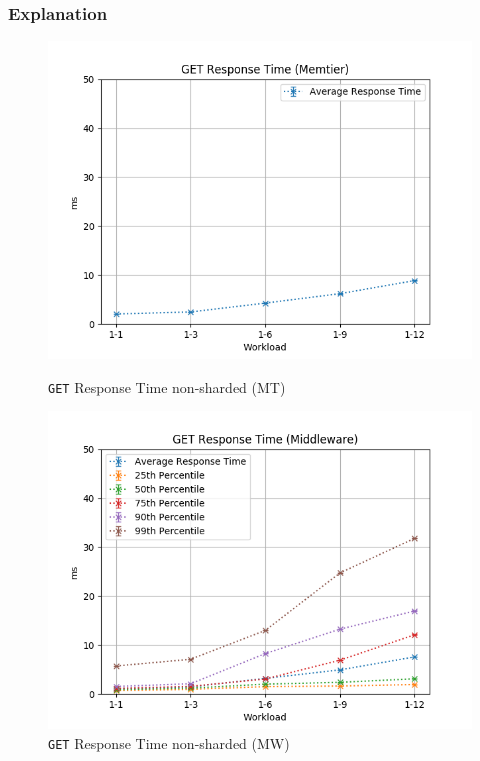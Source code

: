 \documentclass[11pt,a4paper]{article}
\begin{document}
\subsubsection{Explanation}
%
\begin{figure}[H]
	\centering
	\captionsetup{width=0.4\textwidth}
    \begin{minipage}{0.5\textwidth}
        \centering
        \includegraphics[width=\textwidth]{../illustrations/plots/4_2_full_system_read/64/memtier_get_rt_ms.png}
        \caption{\texttt{GET} Response Time non-sharded (MT)}
        \label{fig:full_system_read_mt_rt}
    \end{minipage}\hfill
    \begin{minipage}{0.5\textwidth}
        \centering
        \includegraphics[width=\textwidth]{../illustrations/plots/4_2_full_system_read/64/middleware_get_rt_ms.png}
        \caption{\texttt{GET} Response Time non-sharded (MW)}
        \label{fig:full_system_read_mw_rt}
    \end{minipage}
\end{figure}
\end{document}
